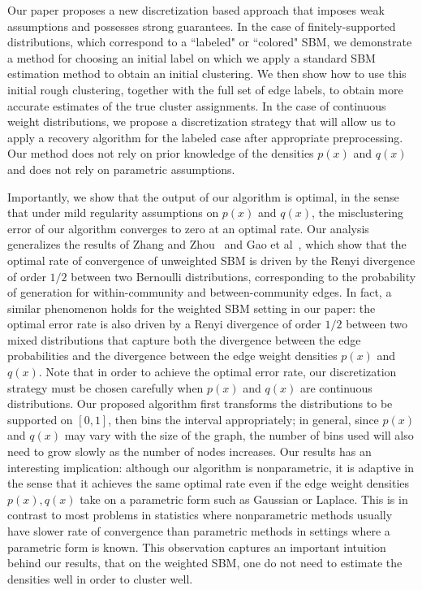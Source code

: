\documentclass{article}
\begin{document}
Our paper proposes a new discretization based approach that imposes weak assumptions and possesses strong guarantees. In the case of finitely-supported distributions, which correspond to a ``labeled" or ``colored" SBM, we demonstrate a method for choosing an initial label on which we apply a standard SBM estimation method to obtain an initial clustering. We then show how to use this initial rough clustering, together with the full set of edge labels, to obtain more accurate estimates of the true cluster assignments. In the case of continuous weight distributions, we propose a discretization strategy that will allow us to apply a recovery algorithm for the labeled case after appropriate preprocessing. Our method does not rely on prior knowledge of the densities $p(x)$ and $q(x)$ and does not rely on parametric assumptions.

Importantly, we show that the output of our algorithm is optimal, in the sense that under mild regularity assumptions on $p(x)$ and $q(x)$, the misclustering error of our algorithm converges to zero at an optimal rate. Our analysis generalizes the results of Zhang and Zhou~\cite{zhangminimax} and Gao et al~\cite{GaoEtal15}, which show that the optimal rate of convergence of unweighted SBM is driven by the Renyi divergence of order $1/2$ between two Bernoulli distributions, corresponding to the probability of generation for within-community and between-community edges. In fact, a similar phenomenon holds for the weighted SBM setting in our paper: the optimal error rate is also driven by a Renyi divergence of order $1/2$ between two mixed distributions that capture both the divergence between the edge probabilities and the divergence between the edge weight densities $p(x)$ and $q(x)$. Note that in order to achieve the optimal error rate, our discretization strategy must be chosen carefully when $p(x)$ and $q(x)$ are continuous distributions. Our proposed algorithm first transforms the distributions to be supported on $[0,1]$, then bins the interval appropriately; in general, since $p(x)$ and $q(x)$ may vary with the size of the graph, the number of bins used will also need to grow slowly as the number of nodes increases. Our results has an interesting implication: although our algorithm is nonparametric, it is adaptive in the sense that it achieves the same optimal rate even if the edge weight densities $p(x), q(x)$ take on a parametric form such as Gaussian or Laplace. This is in contrast to most problems in statistics where nonparametric methods usually have slower rate of convergence than parametric methods in settings where a parametric form is known. This observation captures an important intuition behind our results, that on the weighted SBM, one do not need to estimate the densities well in order to cluster well.
\end{document}
